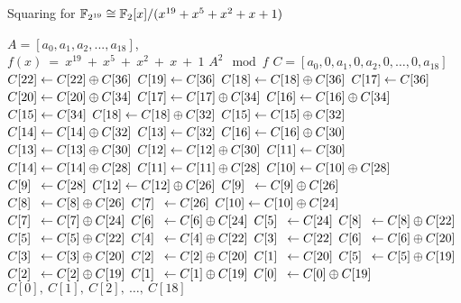 \begin{algorithm}
\caption{Squaring for $\mathbb{F}_{2^{19}} \cong \mathbb{F}_2[x]/(x^{19} + x^5 + x^2 + x + 1)$}
\label{alg:square:example}
\begin{multicols}{2}
\begin{algorithmic}[1]
\REQUIRE $A = [a_0, a_1, a_2, ..., a_{18}]$, \\$f(x)~=~x^{19}~+~x^5~+~x^2~+~x~+~1$
\ENSURE $A^2 \mod f$
\STATE $C = [a_0, 0, a_1, 0, a_2, 0, \ldots, 0, a_{18}]$
\STATE $\mathbox{C[22]}{C[22]} \leftarrow C[22]  \oplus  C[36]$
\STATE $\mathbox{C[22]}{C[19]} \leftarrow C[36]$
\STATE $\mathbox{C[22]}{C[18]} \leftarrow C[18]  \oplus  C[36]$
\STATE $\mathbox{C[22]}{C[17]} \leftarrow C[36]$
\STATE $\mathbox{C[22]}{C[20]} \leftarrow C[20]  \oplus  C[34]$
\STATE $\mathbox{C[22]}{C[17]} \leftarrow C[17]  \oplus  C[34]$
\STATE $\mathbox{C[22]}{C[16]} \leftarrow C[16]  \oplus  C[34]$
\STATE $\mathbox{C[22]}{C[15]} \leftarrow C[34]$
\STATE $\mathbox{C[22]}{C[18]} \leftarrow C[18]  \oplus  C[32]$
\STATE $\mathbox{C[22]}{C[15]} \leftarrow C[15]  \oplus  C[32]$
\STATE $\mathbox{C[22]}{C[14]} \leftarrow C[14]  \oplus  C[32]$
\STATE $\mathbox{C[22]}{C[13]} \leftarrow C[32]$
\STATE $\mathbox{C[22]}{C[16]} \leftarrow C[16]  \oplus  C[30]$
\STATE $\mathbox{C[22]}{C[13]} \leftarrow C[13]  \oplus  C[30]$
\STATE $\mathbox{C[22]}{C[12]} \leftarrow C[12]  \oplus  C[30]$
\STATE $\mathbox{C[22]}{C[11]} \leftarrow C[30]$
\STATE $\mathbox{C[22]}{C[14]} \leftarrow C[14]  \oplus  C[28]$
\STATE $\mathbox{C[22]}{C[11]} \leftarrow C[11]  \oplus  C[28]$
\STATE $\mathbox{C[22]}{C[10]} \leftarrow C[10]  \oplus  C[28]$
\STATE $\mathbox{C[22]}{C[9]} \leftarrow C[28]$
\STATE $\mathbox{C[22]}{C[12]} \leftarrow C[12]  \oplus  C[26]$
\STATE $\mathbox{C[22]}{C[9]} \leftarrow C[9]  \oplus  C[26]$
\STATE $\mathbox{C[22]}{C[8]} \leftarrow C[8]  \oplus  C[26]$
\STATE $\mathbox{C[22]}{C[7]} \leftarrow C[26]$
\STATE $\mathbox{C[22]}{C[10]} \leftarrow C[10]  \oplus  C[24]$
\STATE $\mathbox{C[22]}{C[7]} \leftarrow C[7]  \oplus  C[24]$
\STATE $\mathbox{C[22]}{C[6]} \leftarrow C[6]  \oplus  C[24]$
\STATE $\mathbox{C[22]}{C[5]} \leftarrow C[24]$
\STATE $\mathbox{C[22]}{C[8]} \leftarrow C[8]  \oplus  C[22]$
\STATE $\mathbox{C[22]}{C[5]} \leftarrow C[5]  \oplus  C[22]$
\STATE $\mathbox{C[22]}{C[4]} \leftarrow C[4]  \oplus  C[22]$
\STATE $\mathbox{C[22]}{C[3]} \leftarrow C[22]$
\STATE $\mathbox{C[22]}{C[6]} \leftarrow C[6]  \oplus  C[20]$
\STATE $\mathbox{C[22]}{C[3]} \leftarrow C[3]  \oplus  C[20]$
\STATE $\mathbox{C[22]}{C[2]} \leftarrow C[2]  \oplus  C[20]$
\STATE $\mathbox{C[22]}{C[1]} \leftarrow C[20]$
\STATE $\mathbox{C[22]}{C[5]} \leftarrow C[5]  \oplus  C[19]$
\STATE $\mathbox{C[22]}{C[2]} \leftarrow C[2]  \oplus  C[19]$
\STATE $\mathbox{C[22]}{C[1]} \leftarrow C[1]  \oplus  C[19]$
\STATE $\mathbox{C[22]}{C[0]} \leftarrow C[0]  \oplus  C[19]$
\RETURN $C[0],~C[1],~C[2],~\ldots,~C[18]$
\end{algorithmic}
\end{multicols}
\end{algorithm}

